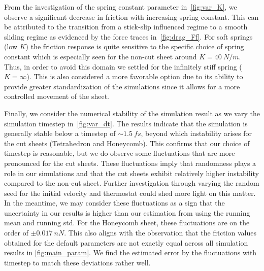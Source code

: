 From the investigation of the spring constant parameter in~\cref{fig:var_K}, we observe a significant decrease in friction with increasing spring constant. This can be attributed to the transition from a stick-slip influenced regime to a smooth sliding regime as evidenced by the force traces in~\cref{fig:drag_Ff}. For soft springs (low $K$) the friction response is quite sensitive to the specific choice of spring constant which is especially seen for the non-cut sheet around $K = \SI{40}{N/m}$. Thus, in order to avoid this domain we settled for the infinitely stiff spring ($K = \infty$). This is also considered a more favorable option due to its ability to provide greater standardization of the simulations since it allows for a more controlled movement of the sheet.

Finally, we consider the numerical stability of the simulation result as we vary
the simulation timestep in~\cref{fig:var_dt}. The results indicate that the
simulation is generally stable below a timestep of $\sim \SI{1.5}{fs}$, beyond
which instability arises for the cut sheets (Tetrahedron and Honeycomb). This
confirms that our choice of timestep is reasonable, but we do observe some
fluctuations that are more pronounced for the cut sheets. These fluctuations
imply that randomness plays a role in our simulations and that the cut sheets
exhibit relatively higher instability compared to the non-cut sheet. Further
investigation through varying the random seed for the initial velocity and
thermostat could shed more light on this matter. In the meantime, we may
consider these fluctuations as a sign that the uncertainty in our results is
higher than our estimation from using the running mean and running
\acrshort{std}. For the Honeycomb sheet, these fluctuations are on the order of
$\pm \SI{0.017}{nN}$. This also aligns with the observation that the friction values
obtained for the default parameters are not
exactly equal across all simulation results in \cref{fig:main_param}. We find the estimated error by the fluctuations with timestep to match these deviations rather well.




